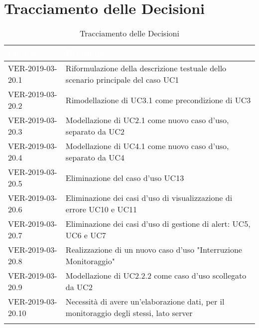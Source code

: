 \newpage
\section{Tracciamento delle Decisioni}

\begin{longtable}{|C{.40\textwidth}|C{.60\textwidth}|}
\hline
{}\textbf{\textcolor{white}{Codice}} & \textbf{\textcolor{white}{Decisione}}\\
\hline \hline
\endhead
VER-2019-03-20.1 & Riformulazione della descrizione testuale dello scenario principale del caso UC1\\
\hline
{}VER-2019-03-20.2 & Rimodellazione di UC3.1 come precondizione di UC3\\
\hline
VER-2019-03-20.3 & Modellazione di UC2.1 come nuovo caso d'uso, separato da UC2\\
\hline
{}VER-2019-03-20.4 & Modellazione di UC4.1 come nuovo caso d'uso, separato da UC4\\
\hline
VER-2019-03-20.5 & Eliminazione del caso d'uso UC13\\
\hline
{}VER-2019-03-20.6 & Eliminazione dei casi d'uso di visualizzazione di errore UC10 e UC11\\
\hline
VER-2019-03-20.7 & Eliminazione dei casi d'uso di gestione di alert: UC5, UC6 e UC7\\
\hline
{}VER-2019-03-20.8 & Realizzazione di un nuovo caso d'uso "Interruzione Monitoraggio"\\
\hline
VER-2019-03-20.9 & Modellazione di UC2.2.2 come caso d'uso scollegato da UC2\\
\hline
{}VER-2019-03-20.10 & Necessità di avere un'elaborazione dati, per il monitoraggio degli stessi, lato server\\
\hline
\caption{Tracciamento delle Decisioni}
\end{longtable}
